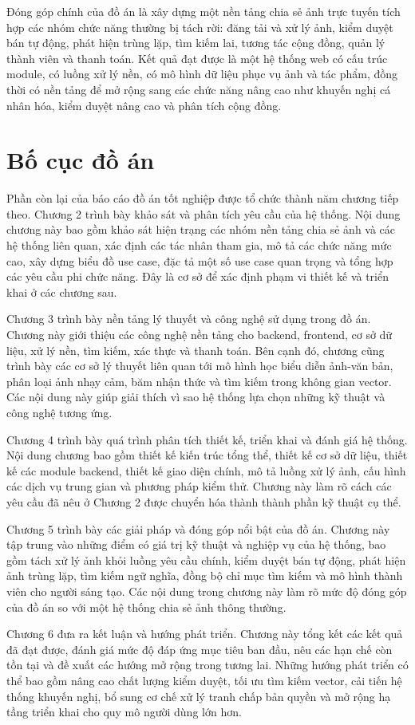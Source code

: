 Đóng góp chính của đồ án là xây dựng một nền tảng chia sẻ ảnh trực tuyến tích hợp các nhóm chức năng thường bị tách rời: đăng tải và xử lý ảnh, kiểm duyệt bán tự động, phát hiện trùng lặp, tìm kiếm lai, tương tác cộng đồng, quản lý thành viên và thanh toán. Kết quả đạt được là một hệ thống web có cấu trúc module, có luồng xử lý nền, có mô hình dữ liệu phục vụ ảnh và tác phẩm, đồng thời có nền tảng để mở rộng sang các chức năng nâng cao như khuyến nghị cá nhân hóa, kiểm duyệt nâng cao và phân tích cộng đồng.

\section{Bố cục đồ án}

Phần còn lại của báo cáo đồ án tốt nghiệp được tổ chức thành năm chương tiếp theo. Chương 2 trình bày khảo sát và phân tích yêu cầu của hệ thống. Nội dung chương này bao gồm khảo sát hiện trạng các nhóm nền tảng chia sẻ ảnh và các hệ thống liên quan, xác định các tác nhân tham gia, mô tả các chức năng mức cao, xây dựng biểu đồ use case, đặc tả một số use case quan trọng và tổng hợp các yêu cầu phi chức năng. Đây là cơ sở để xác định phạm vi thiết kế và triển khai ở các chương sau.

Chương 3 trình bày nền tảng lý thuyết và công nghệ sử dụng trong đồ án. Chương này giới thiệu các công nghệ nền tảng cho backend, frontend, cơ sở dữ liệu, xử lý nền, tìm kiếm, xác thực và thanh toán. Bên cạnh đó, chương cũng trình bày các cơ sở lý thuyết liên quan tới mô hình học biểu diễn ảnh-văn bản, phân loại ảnh nhạy cảm, băm nhận thức và tìm kiếm trong không gian vector. Các nội dung này giúp giải thích vì sao hệ thống lựa chọn những kỹ thuật và công nghệ tương ứng.

Chương 4 trình bày quá trình phân tích thiết kế, triển khai và đánh giá hệ thống. Nội dung chương bao gồm thiết kế kiến trúc tổng thể, thiết kế cơ sở dữ liệu, thiết kế các module backend, thiết kế giao diện chính, mô tả luồng xử lý ảnh, cấu hình các dịch vụ trung gian và phương pháp kiểm thử. Chương này làm rõ cách các yêu cầu đã nêu ở Chương 2 được chuyển hóa thành thành phần kỹ thuật cụ thể.

Chương 5 trình bày các giải pháp và đóng góp nổi bật của đồ án. Chương này tập trung vào những điểm có giá trị kỹ thuật và nghiệp vụ của hệ thống, bao gồm tách xử lý ảnh khỏi luồng yêu cầu chính, kiểm duyệt bán tự động, phát hiện ảnh trùng lặp, tìm kiếm ngữ nghĩa, đồng bộ chỉ mục tìm kiếm và mô hình thành viên cho người sáng tạo. Các nội dung trong chương này làm rõ mức độ đóng góp của đồ án so với một hệ thống chia sẻ ảnh thông thường.

Chương 6 đưa ra kết luận và hướng phát triển. Chương này tổng kết các kết quả đã đạt được, đánh giá mức độ đáp ứng mục tiêu ban đầu, nêu các hạn chế còn tồn tại và đề xuất các hướng mở rộng trong tương lai. Những hướng phát triển có thể bao gồm nâng cao chất lượng kiểm duyệt, tối ưu tìm kiếm vector, cải tiến hệ thống khuyến nghị, bổ sung cơ chế xử lý tranh chấp bản quyền và mở rộng hạ tầng triển khai cho quy mô người dùng lớn hơn.
